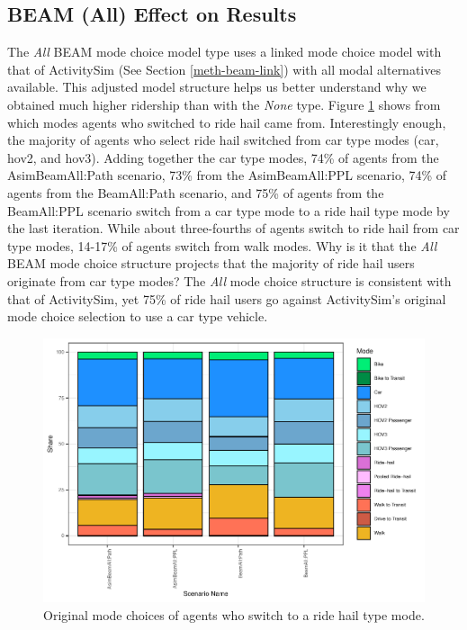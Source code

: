 \documentclass[12pt, oneside, openright]{byuthesis}
\begin{document}
\hypertarget{type3}{%
\subsection{BEAM (All) Effect on Results}\label{type3}}

The \emph{All} BEAM mode choice model type uses a linked mode choice model with that of ActivitySim (See Section \ref{meth-beam-link}) with all modal alternatives available. This adjusted model structure helps us better understand why we obtained much higher ridership than with the \emph{None} type. Figure \ref{fig:piechart} shows from which modes agents who switched to ride hail came from. Interestingly enough, the majority of agents who select ride hail switched from car type modes (car, hov2, and hov3). Adding together the car type modes, 74\% of agents from the AsimBeamAll:Path scenario, 73\% from the AsimBeamAll:PPL scenario, 74\% of agents from the BeamAll:Path scenario, and 75\% of agents from the BeamAll:PPL scenario switch from a car type mode to a ride hail type mode by the last iteration. While about three-fourths of agents switch to ride hail from car type modes, 14-17\% of agents switch from walk modes. Why is it that the \emph{All} BEAM mode choice structure projects that the majority of ride hail users originate from car type modes? The \emph{All} mode choice structure is consistent with that of ActivitySim, yet 75\% of ride hail users go against ActivitySim's original mode choice selection to use a car type vehicle.

\begin{figure}

{\centering \includegraphics{thesis_files/figure-latex/piechart-1} 

}

\caption{Original mode choices of agents who switch to a ride hail type mode.}\label{fig:piechart}
\end{figure}
\end{document}
